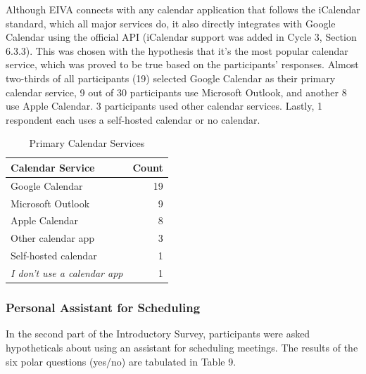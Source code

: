 \documentclass{article}
\begin{document}
Although EIVA connects with any calendar application that follows the iCalendar standard, which all major services do, it also directly integrates with Google Calendar using the official API (iCalendar support was added in Cycle 3, Section 6.3.3). This was chosen with the hypothesis that it's the most popular calendar service, which was proved to be true based on the participants' responses. Almost two-thirds of all participants (19) selected Google Calendar as their primary calendar service, 9 out of 30 participants use Microsoft Outlook, and another 8 use Apple Calendar. 3 participants used other calendar services. Lastly, 1 respondent each uses a self-hosted calendar or no calendar.

\begin{table}[!htb]
	\begin{minipage}{1\linewidth}
		\caption{Primary Calendar Services}
		\centering
		\begin{tabular}{lr}
			\hline
			\textbf{Calendar Service}         & \textbf{Count} \\
			\hline
			Google Calendar                   & 19             \\
			Microsoft Outlook                 & 9              \\
			Apple Calendar                    & 8              \\
			Other calendar app                & 3              \\
			Self-hosted calendar              & 1              \\
			\emph{I don't use a calendar app} & 1              \\
			\hline
		\end{tabular}
	\end{minipage}%
\end{table}

\subsubsection{Personal Assistant for Scheduling}

In the second part of the Introductory Survey, participants were asked hypotheticals about using an assistant for scheduling meetings. The results of the six polar questions (yes/no) are tabulated in Table 9.
\end{document}
